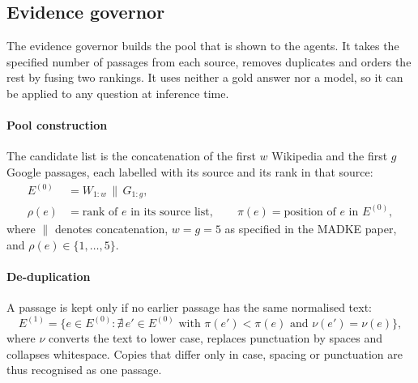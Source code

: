 \subsection{Evidence governor}
\label{sec:m_governor}

The evidence governor builds the pool that is shown to the agents. It takes the specified number of passages from each source, removes duplicates and orders the rest by fusing two rankings. It uses neither a gold answer nor a model, so it can be applied to any question at inference time.

\paragraph{Pool construction}
The candidate list is the concatenation of the first $w$ Wikipedia and the first $g$ Google passages, each labelled with its source and its rank in that source:
\begin{equation}
\begin{aligned}
E^{(0)} &= W_{1:w} \,\|\, G_{1:g},\\
\rho(e) &= \text{rank of } e \text{ in its source list}, \qquad \pi(e) = \text{position of } e \text{ in } E^{(0)},
\end{aligned}
\label{eq:pool}
\end{equation}
where $\|$ denotes concatenation, $w=g=5$ as specified in the MADKE paper, and $\rho(e)\in\{1,\dots,5\}$.

\paragraph{De-duplication}
A passage is kept only if no earlier passage has the same normalised text:
\begin{equation}
E^{(1)} = \big\{ e\in E^{(0)} : \nexists\, e'\in E^{(0)} \text{ with } \pi(e')<\pi(e) \text{ and } \nu(e')=\nu(e) \big\},
\label{eq:dedup}
\end{equation}
where $\nu$ converts the text to lower case, replaces punctuation by spaces and collapses whitespace. Copies that differ only in case, spacing or punctuation are thus recognised as one passage.

